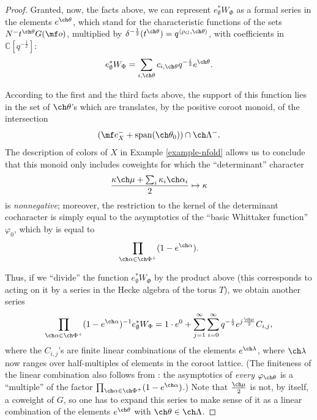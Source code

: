 \documentclass[final]{amsart}
\theoremstyle{remark}
\theoremstyle{definition}
\numberwithin{equation}{section}
\begin{document}
\begin{proof}
Granted, now, the facts above, we can represent $e_\emptyset^* W_{\Phi}$ as a formal series in the elements $e^{\ch\theta}$, which stand for the characteristic functions of the sets $N^- t^{\ch\theta} G(\mf o)$, multiplied by $\delta^{-\frac{1}{2}}(t^{\ch\theta}) = q^{\left<\rho_G,\ch\theta\right>}$, with coefficients in $\mathbb C[q^{-\frac{1}{2}}]$:
\[ e_\emptyset^* W_{\Phi} = \sum_{i,\ch\theta} c_{i,\ch\theta} q^{-\frac{i}{2}} e^{\ch\theta}.\]

According to the first and the third facts above, the support of this function lies in the set of $\ch\theta$'s which are translates, by the positive coroot monoid, of the intersection
\[ (\mf c_X^- + \text{span}(\ch\theta_0)) \cap \ch\Lambda^-.\]
The description of colors of $X$ in Example \ref{example-nfold} allows us to conclude that this monoid only includes coweights for which the ``determinant'' character 
\[\frac{\kappa \ch\mu + \sum_i \kappa_i \ch\alpha_i}{2} \mapsto \kappa\]
is \emph{nonnegative}; moreover, the restriction to the kernel of the determinant
cocharacter is simply equal to the asymptotics of the ``basic Whittaker function'' $\varphi_0$, which by \cite[Theorem 6.8 and Example 6.4]{SaSatake} is equal to 
\[\prod_{\ch\alpha \in \ch\Phi^+} (1-e^{\ch\alpha}).\]

Thus, if we ``divide'' the function $e_\emptyset^* W_{\Phi}$ by the product above (this corresponds to acting on it by a series in the Hecke algebra of the torus $T$), we obtain another series
\[\prod_{\ch\alpha \in \ch\Phi^+} (1-e^{\ch\alpha})^{-1} e_\emptyset^* W_{\Phi} = 
1\cdot e^0 + \sum_{j=1}^\infty \sum_{i=0}^\infty q^{-\frac{i}{2}} e^{j\frac{\ch\mu}{2}} C_{i,j}
,\]
where the $C_{i,j}$'s are finite linear combinations of the elements $e^{\ch\lambda}$, where $\ch\lambda$ now ranges over half-multiples of elements in the coroot lattice. (The finiteness of the linear combination also follows from \cite[Theorem 6.8 and Example 6.4]{SaSatake}: the asymptotics of \emph{every} $\varphi_{\ch\theta}$ is a ``multiple'' of the factor $\prod_{\ch\alpha \in \ch\Phi^+} (1-e^{\ch\alpha})$.)
Note that $\frac{\ch\mu}{2}$ is not, by itself, a coweight of $G$, so one has to expand this series to make sense of it as a linear combination of the elements $e^{\ch\theta}$ with $\ch\theta \in \ch\Lambda$.


\end{proof}
\end{document}
